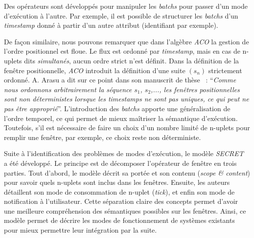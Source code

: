 Des opérateurs sont développés pour manipuler les \textit{batchs} pour passer d'un mode d'exécution à l'autre. Par exemple, il est possible de structurer les \textit{batchs} d'un \textit{timestamp} donné à partir d'un autre attribut (identifiant par exemple).

De façon similaire, nous pouvons remarquer que dans l'algèbre \textit{ACO} la gestion de l'ordre positionnel est floue. Le flux est ordonné par \textit{timestamp}, mais en cas de n-uplets dits \textit{simultanés}, aucun ordre strict n'est définit. Dans la définition de la fenêtre positionnelle, \textit{ACO} introduit la définition d'une suite $(s_n)$ strictement ordonné. A. Arasu a dit sur ce point dans son manuscrit de thèse~\cite{Arasu:queries} : \enquote{\it Comme nous ordonnons arbitrairement la séquence $s_1$, $s_2$,..., les fenêtres positionnelles sont non déterministes lorsque les \textit{timestamps} ne sont pas uniques, ce qui peut ne pas être approprié}. L'introduction des \textit{batchs} apporte une généralisation de l'ordre temporel, ce qui permet de mieux maîtriser la sémantique d'exécution. Toutefois, s'il est nécessaire de faire un choix d'un nombre limité de n-uplets pour remplir une fenêtre, par exemple, ce choix reste non déterministe.

Suite à l'identification des problèmes de modes d'exécution, le modèle \textit{SECRET}~\cite{Botan:secret} a été développé. Le principe est de décomposer l'opérateur de fenêtre en trois parties. Tout d'abord, le modèle décrit sa portée et son contenu (\textit{scope \& content}) pour savoir quels n-uplets sont inclus dans les fenêtres. Ensuite, les auteurs détaillent son mode de consommation de n-uplet (\textit{tick}), et enfin son mode de notification à l'utilisateur. Cette séparation claire des concepts permet d'avoir une meilleure compréhension des sémantiques possibles sur les fenêtres. Ainsi, ce modèle permet de décrire les modes de fonctionnement de systèmes existants pour mieux permettre leur intégration par la suite.

